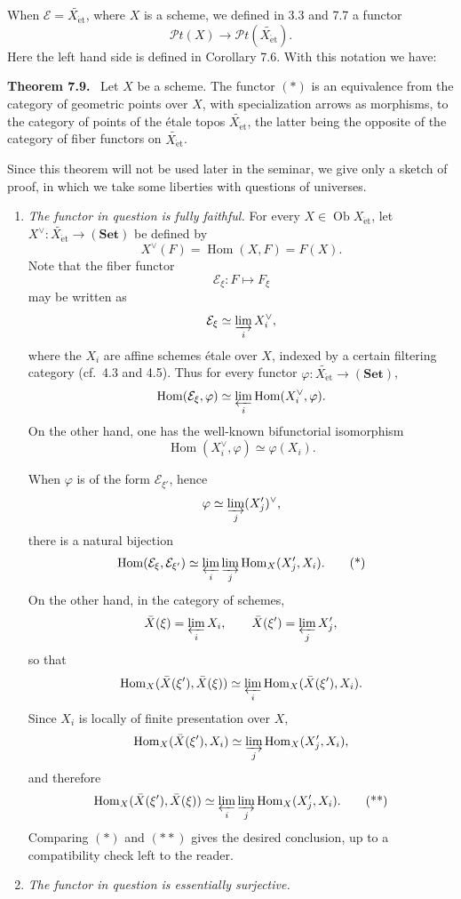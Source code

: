 \documentclass[11pt]{article}
\newcommand{\E}{\mathcal{E}}
\newcommand{\Pt}{\mathcal{P}t}
\newcommand{\Hom}{\operatorname{Hom}}
\newcommand{\Ob}{\operatorname{Ob}}
\newcommand{\et}{\mathrm{\acute{e}t}}
\newcommand{\cf}{cf.\ }
\newenvironment{statement}[1]{\par\medskip\noindent\textbf{#1.}\ }{\par\medskip}
\begin{document}
When \(\E=\widetilde{X_{\et}}\), where \(X\) is a scheme, we defined in 3.3 and 7.7 a functor
\[
\Pt(X)\longrightarrow \Pt(\widetilde{X_{\et}}).
\tag{*}
\]
Here the left hand side is defined in Corollary 7.6. With this notation we have:

\begin{statement}{Theorem 7.9}
Let \(X\) be a scheme. The functor \((*)\) is an equivalence from the category of geometric points over \(X\), with specialization arrows as morphisms, to the category of points of the \'etale topos \(\widetilde{X_{\et}}\), the latter being the opposite of the category of fiber functors on \(\widetilde{X_{\et}}\).
\end{statement}

Since this theorem will not be used later in the seminar, we give only a sketch of proof, in which we take some liberties with questions of universes.

\begin{enumerate}[label=\alph*)]
\item \emph{The functor in question is fully faithful.} For every \(X\in\Ob X_{\et}\), let \(X^\vee:\widetilde{X_{\et}}\to(\mathbf{Set})\) be defined by
\[
X^\vee(F)=\Hom(X,F)=F(X).
\]
Note that the fiber functor
\[
\mathcal E_\xi:F\longmapsto F_\xi
\]
may be written as
\[
\mathcal E_\xi\simeq \varinjlim_i X_i^\vee,
\]
where the \(X_i\) are affine schemes \'etale over \(X\), indexed by a certain filtering category (\cf 4.3 and 4.5). Thus for every functor \(\varphi:\widetilde{X_{\et}}\to(\mathbf{Set})\),
\[
\Hom(\mathcal E_\xi,\varphi)\simeq \varprojlim_i\Hom(X_i^\vee,\varphi).
\]
On the other hand, one has the well-known bifunctorial isomorphism
\[
\Hom(X_i^\vee,\varphi)\simeq\varphi(X_i).
\]

When \(\varphi\) is of the form \(\mathcal E_{\xi'}\), hence
\[
\varphi\simeq\varinjlim_j (X'_j)^\vee,
\]
there is a natural bijection
\[
\Hom(\mathcal E_\xi,\mathcal E_{\xi'})\simeq
\varprojlim_i\varinjlim_j\Hom_X(X'_j,X_i).
\tag{*}
\]
On the other hand, in the category of schemes,
\[
\bar X(\xi)=\varprojlim_i X_i,
\qquad
\bar X(\xi')=\varprojlim_j X'_j,
\]
so that
\[
\Hom_X(\bar X(\xi'),\bar X(\xi))\simeq
\varprojlim_i\Hom_X(\bar X(\xi'),X_i).
\]
Since \(X_i\) is locally of finite presentation over \(X\),
\[
\Hom_X(\bar X(\xi'),X_i)\simeq
\varinjlim_j\Hom_X(X'_j,X_i),
\]
and therefore
\[
\Hom_X(\bar X(\xi'),\bar X(\xi))\simeq
\varprojlim_i\varinjlim_j\Hom_X(X'_j,X_i).
\tag{**}
\]
Comparing \((*)\) and \((**)\) gives the desired conclusion, up to a compatibility check left to the reader.

\item \emph{The functor in question is essentially surjective.}
\end{enumerate}
\end{document}
